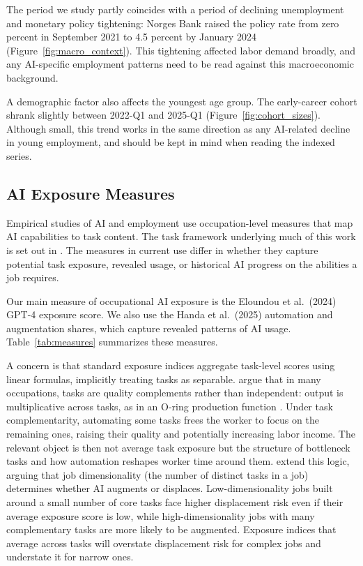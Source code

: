 \documentclass[12pt]{article}
\begin{document}
The period we study partly coincides with a period of declining unemployment and monetary policy tightening: Norges Bank raised the policy rate from zero percent in September 2021 to 4.5 percent by January 2024 (Figure~\ref{fig:macro_context}). This tightening affected labor demand broadly, and any AI-specific employment patterns need to be read against this macroeconomic background.

A demographic factor also affects the youngest age group. The early-career cohort shrank slightly between 2022-Q1 and 2025-Q1 (Figure~\ref{fig:cohort_sizes}). Although small, this trend works in the same direction as any AI-related decline in young employment, and should be kept in mind when reading the indexed series.

\subsection{AI Exposure Measures}\label{sec:data:ai}

Empirical studies of AI and employment use occupation-level measures that map AI capabilities to task content. The task framework underlying much of this work is set out in \citep{autor2003skill, acemoglu2011, acemoglu2018race, acemoglu2019automation}. The measures in current use differ in whether they capture potential task exposure, revealed usage, or historical AI progress on the abilities a job requires.

Our main measure of occupational AI exposure is the Eloundou et al.\ (2024) GPT-4 exposure score. We also use the Handa et al.\ (2025) automation and augmentation shares, which capture revealed patterns of AI usage. Table~\ref{tab:measures} summarizes these measures.

A concern is that standard exposure indices aggregate task-level scores using linear formulas, implicitly treating tasks as separable. \cite{gans2025} argue that in many occupations, tasks are quality complements rather than independent: output is multiplicative across tasks, as in an O-ring production function \citep{kremer1993}. Under task complementarity, automating some tasks frees the worker to focus on the remaining ones, raising their quality and potentially increasing labor income. The relevant object is then not average task exposure but the structure of bottleneck tasks and how automation reshapes worker time around them. \cite{imas2026} extend this logic, arguing that job dimensionality (the number of distinct tasks in a job) determines whether AI augments or displaces. Low-dimensionality jobs built around a small number of core tasks face higher displacement risk even if their average exposure score is low, while high-dimensionality jobs with many complementary tasks are more likely to be augmented. Exposure indices that average across tasks will overstate displacement risk for complex jobs and understate it for narrow ones.
\end{document}
